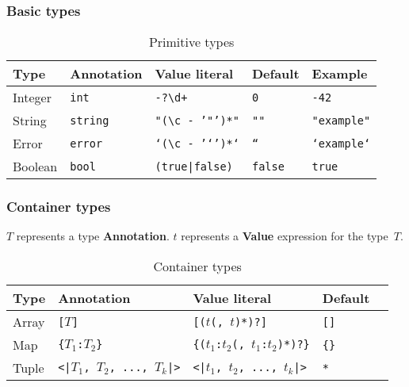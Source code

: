 \documentclass{article}
\begin{document}
\subsubsection{Basic types}

\begin{table}[h]
\centering
\label{primitive-types}
\begin{tabular}{|l|l|l|l|l|} \hline
\textbf{Type} & \textbf{Annotation} & \textbf{Value literal}               & \textbf{Default} & \textbf{Example}   \\ \hline
Integer       & \texttt{int}        & \texttt{-?\textbackslash d+}         & \texttt{0}       & \texttt{-42}       \\ \hline
String        & \texttt{string}     & \texttt{"(\textbackslash c - '"')*"} & \texttt{""}      & \texttt{"example"} \\ \hline
Error         & \texttt{error}      & \texttt{`(\textbackslash c - '`')*`} & \texttt{``}      & \texttt{`example`} \\ \hline
Boolean       & \texttt{bool}       & \texttt{(true|false)}                & \texttt{false}   & \texttt{true}      \\ \hline
\end{tabular}
\caption{Primitive types}
\end{table}

\subsubsection{Container types}
$T$ represents a type \textbf{Annotation}. $t$ represents a \textbf{Value}
expression for the type~$T$.

\begin{table}[h]
\centering
\label{container-types}
\begin{tabular}{|l|l|l|l|l|} \hline
\textbf{Type} & \textbf{Annotation}                   & \textbf{Value literal}                      & \textbf{Default} \\ \hline
Array         & \texttt{[$T$]}                        & \texttt{[($t$(, $t$)*)?]}                   & \texttt{[]}      \\ \hline
Map           & \texttt{\{$T_1$:$T_2$\}}              & \texttt{\{($t_1$:$t_2$(, $t_1$:$t_2$)*)?\}} & \texttt{\{\}}    \\ \hline
Tuple         & \texttt{<|$T_1$, $T_2$, ..., $T_k$|>} & \texttt{<|$t_1$, $t_2$, ..., $t_k$|>}       & \texttt{*}       \\ \hline
\end{tabular}
\caption{Container types}
\end{table}
\end{document}
